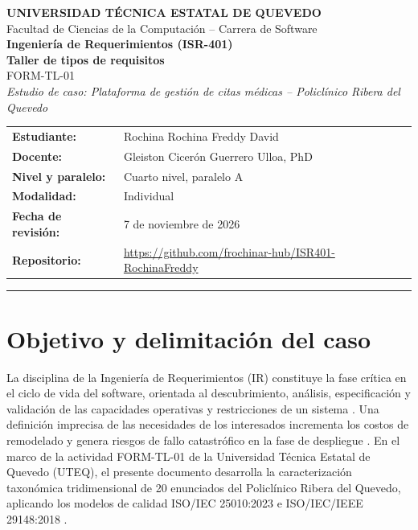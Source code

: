 \documentclass[11pt,a4paper]{article}
\newcommand{\NombreEstudiante}{Rochina Rochina Freddy David}
\newcommand{\RepoTexto}{https://github.com/frochinar-hub/ISR401-RochinaFreddy}
\newcommand{\FechaRevision}{7 de noviembre de 2026}
\newcommand{\Docente}{Gleiston Cicerón Guerrero Ulloa, PhD}
\begin{document}
	
	\begin{center}
		{\Large \textbf{UNIVERSIDAD TÉCNICA ESTATAL DE QUEVEDO}}\\[0.2cm]
		{\normalsize Facultad de Ciencias de la Computación -- Carrera de Software}\\[0.4cm]
		{\large \textbf{Ingeniería de Requerimientos (ISR-401)}}\\[0.1cm]
		{\Large \textbf{Taller de tipos de requisitos}}\\[0.1cm]
		{\normalsize FORM-TL-01}\\[0.2cm]
		{\small \textit{Estudio de caso: Plataforma de gestión de citas médicas -- Policlínico Ribera del Quevedo }}
	\end{center}
	
	\vspace{0.3cm}
	
	\noindent
	\begin{tabularx}{\textwidth}{>{\bfseries}l X}
		Estudiante: & \NombreEstudiante \\
		Docente: & \Docente \\
		Nivel y paralelo: & Cuarto nivel, paralelo A \\
		Modalidad: & Individual \\
		Fecha de revisión: & \FechaRevision \\
		Repositorio: & \url{\RepoTexto} \\
	\end{tabularx}
	
	\vspace{0.2cm}
	\hrule
	\vspace{0.2cm}
	
	\section{Objetivo y delimitación del caso}
	La disciplina de la Ingeniería de Requerimientos (IR) constituye la fase crítica en el ciclo de vida del software, orientada al descubrimiento, análisis, especificación y validación de las capacidades operativas y restricciones de un sistema \cite{sommerville2019, wiegers2013}. Una definición imprecisa de las necesidades de los interesados incrementa los costos de remodelado y genera riesgos de fallo catastrófico en la fase de despliegue \cite{pohl2025, pressman2020}. En el marco de la actividad FORM-TL-01 de la Universidad Técnica Estatal de Quevedo (UTEQ), el presente documento desarrolla la caracterización taxonómica tridimensional de 20 enunciados del Policlínico Ribera del Quevedo, aplicando los modelos de calidad ISO/IEC 25010:2023 e ISO/IEC/IEEE 29148:2018 \cite{iso25010, iso29148}.
	
\end{document}
